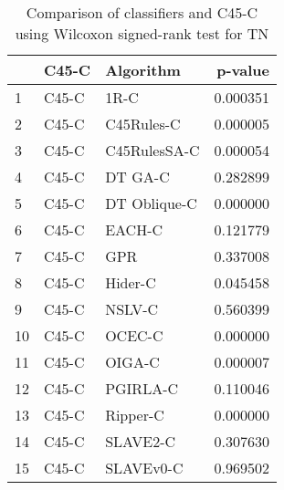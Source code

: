 \begin{table}
\footnotesize
\caption{Comparison of classifiers and C45-C using Wilcoxon signed-rank test for TN}
\label{tab:C45-C wilcoxon TN comparison}
\begin{tabular}{lllr}
\hline
 & C45-C & Algorithm & p-value \\
\hline
1 & C45-C & 1R-C & 0.000351 \\
2 & C45-C & C45Rules-C & 0.000005 \\
3 & C45-C & C45RulesSA-C & 0.000054 \\
4 & C45-C & DT GA-C & 0.282899 \\
5 & C45-C & DT Oblique-C & 0.000000 \\
6 & C45-C & EACH-C & 0.121779 \\
7 & C45-C & GPR & 0.337008 \\
8 & C45-C & Hider-C & 0.045458 \\
9 & C45-C & NSLV-C & 0.560399 \\
10 & C45-C & OCEC-C & 0.000000 \\
11 & C45-C & OIGA-C & 0.000007 \\
12 & C45-C & PGIRLA-C & 0.110046 \\
13 & C45-C & Ripper-C & 0.000000 \\
14 & C45-C & SLAVE2-C & 0.307630 \\
15 & C45-C & SLAVEv0-C & 0.969502 \\
\hline
\end{tabular}
\end{table}
